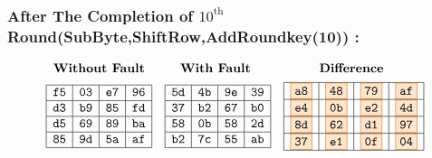 \subsubsection{After The Completion of $10^{\text{th}}$ Round(SubByte,ShiftRow,AddRoundkey(10)) :}
\[
\begin{array}{ccc}
\textbf{Without Fault} & \textbf{With Fault } & \textbf{Difference } \\[1ex]
\begin{array}{|c|c|c|c|}
    \hline
    \texttt{f5} & \texttt{03} & \texttt{e7} & \texttt{96} \\
    \hline
    \texttt{d3} & \texttt{b9} & \texttt{85} & \texttt{fd} \\
    \hline
    \texttt{d5} & \texttt{69} & \texttt{89} & \texttt{ba} \\
    \hline
    \texttt{85} & \texttt{9d} & \texttt{5a} & \texttt{af} \\
    \hline
\end{array} 
&

\begin{array}{|c|c|c|c|}
    \hline
    \texttt{5d} & \texttt{4b} & \texttt{9e} & \texttt{39} \\
    \hline
    \texttt{37} & \texttt{b2} & \texttt{67} & \texttt{b0} \\
    \hline
    \texttt{58} & \texttt{0b} & \texttt{58} & \texttt{2d} \\
    \hline
    \texttt{b2} & \texttt{7c} & \texttt{55} & \texttt{ab} \\
    \hline
    \end{array}

    &

\begin{array}{|c|c|c|c|}
    \hline
    \fcolorbox{orange!80!black}{orange!20}{\texttt{a8}} & \fcolorbox{orange!80!black}{orange!20}{\texttt{48}} & \fcolorbox{orange!80!black}{orange!20}{\texttt{79}} & \fcolorbox{orange!80!black}{orange!20}{\texttt{af}} \\
    \hline
    \fcolorbox{orange!80!black}{orange!20}{\texttt{e4}} & \fcolorbox{orange!80!black}{orange!20}{\texttt{0b}} & \fcolorbox{orange!80!black}{orange!20}{\texttt{e2}} & \fcolorbox{orange!80!black}{orange!20}{\texttt{4d}} \\
    \hline
    \fcolorbox{orange!80!black}{orange!20}{\texttt{8d}} & \fcolorbox{orange!80!black}{orange!20}{\texttt{62}} & \fcolorbox{orange!80!black}{orange!20}{\texttt{d1}} & \fcolorbox{orange!80!black}{orange!20}{\texttt{97}} \\
    \hline
    \fcolorbox{orange!80!black}{orange!20}{\texttt{37}} & \fcolorbox{orange!80!black}{orange!20}{\texttt{e1}} & \fcolorbox{orange!80!black}{orange!20}{\texttt{0f}} & \fcolorbox{orange!80!black}{orange!20}{\texttt{04}} \\
    \hline
    \end{array}
\end{array}
\]
